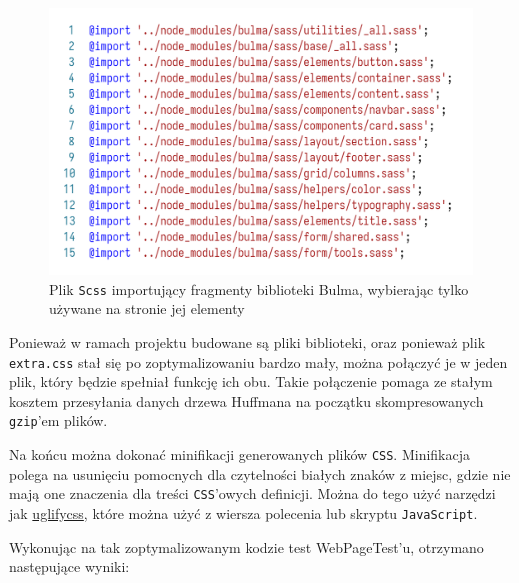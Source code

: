 \documentclass[licencjacka]{pracadypl}
\begin{document}
\begin{figure}[H]
  \centering
  \includegraphics[width=\linewidth/\real{1.5}]{images/code-scss-import-bulma.png}
  \caption{Plik \texttt{Scss} importujący fragmenty biblioteki Bulma, wybierając tylko używane na stronie jej elementy}
  \label{fig:code-scss-import-bulma}
\end{figure}

Ponieważ w ramach projektu budowane są pliki biblioteki, oraz ponieważ plik \texttt{extra.css} stał się po zoptymalizowaniu bardzo mały, można połączyć je w jeden plik, który będzie spełniał funkcję ich obu. Takie połączenie pomaga ze stałym kosztem przesyłania danych drzewa Huffmana na początku skompresowanych \texttt{gzip}'em plików.

Na końcu można dokonać minifikacji generowanych plików \texttt{CSS}. Minifikacja polega na usunięciu pomocnych dla czytelności białych znaków z miejsc, gdzie nie mają one znaczenia dla treści \texttt{CSS}'owych definicji. Można do tego użyć narzędzi jak \href{https://www.npmjs.com/package/uglifycss}{uglifycss}, które można użyć z wiersza polecenia lub skryptu \texttt{JavaScript}.

Wykonując na tak zoptymalizowanym kodzie test WebPageTest'u, otrzymano następujące wyniki:
\end{document}
